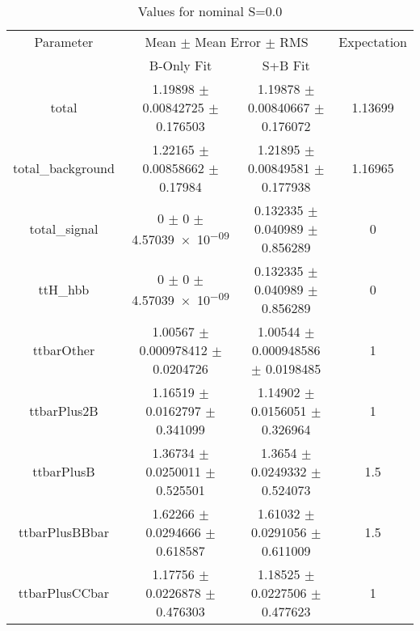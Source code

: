 \begin{table}
\centering
\caption{Values for nominal S=0.0}
\begin{tabular}{cccc}
\toprule
Parameter & \multicolumn{2}{c}{Mean $\pm$ Mean Error $\pm$ RMS} & Expectation\\
 & B-Only Fit & S+B Fit & \\
\midrule
total & \num{1.19898} $\pm$ \num{0.00842725} $\pm$ \num{0.176503} & \num{1.19878} $\pm$ \num{0.00840667} $\pm$ \num{0.176072} & \num{1.13699}\\
total\_background & \num{1.22165} $\pm$ \num{0.00858662} $\pm$ \num{0.17984} & \num{1.21895} $\pm$ \num{0.00849581} $\pm$ \num{0.177938} & \num{1.16965}\\
total\_signal & \num{0} $\pm$ \num{0} $\pm$ \num{4.57039e-09} & \num{0.132335} $\pm$ \num{0.040989} $\pm$ \num{0.856289} & \num{0}\\
ttH\_hbb & \num{0} $\pm$ \num{0} $\pm$ \num{4.57039e-09} & \num{0.132335} $\pm$ \num{0.040989} $\pm$ \num{0.856289} & \num{0}\\
ttbarOther & \num{1.00567} $\pm$ \num{0.000978412} $\pm$ \num{0.0204726} & \num{1.00544} $\pm$ \num{0.000948586} $\pm$ \num{0.0198485} & \num{1}\\
ttbarPlus2B & \num{1.16519} $\pm$ \num{0.0162797} $\pm$ \num{0.341099} & \num{1.14902} $\pm$ \num{0.0156051} $\pm$ \num{0.326964} & \num{1}\\
ttbarPlusB & \num{1.36734} $\pm$ \num{0.0250011} $\pm$ \num{0.525501} & \num{1.3654} $\pm$ \num{0.0249332} $\pm$ \num{0.524073} & \num{1.5}\\
ttbarPlusBBbar & \num{1.62266} $\pm$ \num{0.0294666} $\pm$ \num{0.618587} & \num{1.61032} $\pm$ \num{0.0291056} $\pm$ \num{0.611009} & \num{1.5}\\
ttbarPlusCCbar & \num{1.17756} $\pm$ \num{0.0226878} $\pm$ \num{0.476303} & \num{1.18525} $\pm$ \num{0.0227506} $\pm$ \num{0.477623} & \num{1}\\
\bottomrule
\end{tabular}
\end{table}